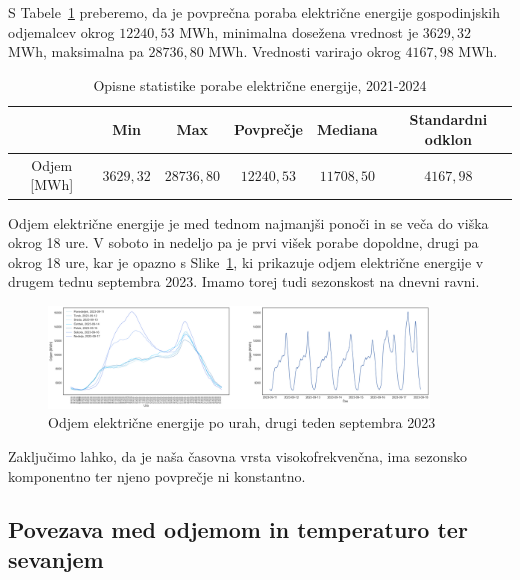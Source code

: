 \documentclass[a4paper, 11pt]{article}
\begin{document}
\noindent S Tabele~\ref{Tab:opisne_statistike} preberemo, da je povprečna poraba električne energije gospodinjskih odjemalcev
okrog $12240{,}53 $ MWh, minimalna dosežena vrednost je $3629{,}32$ MWh, maksimalna pa $28736{,}80$ MWh. Vrednosti varirajo
okrog $4167{,}98$ MWh. \\

\begin{table}[!h]
    \centering
    \caption{Opisne statistike porabe električne energije, 2021-2024}\par\medskip
    \label{Tab:opisne_statistike}
    \begin{tabular}{c||c|c|c|c|c}
              & Min & Max & Povprečje & Mediana & Standardni odklon \\ \hline \hline
        Odjem [MWh] & $3629{,}32$ & $28736{,}80$ & $12240{,}53$ & $11708{,}50$ & $4167{,}98$ \\ 
    \end{tabular}
\end{table}

\noindent Odjem električne energije je med tednom najmanjši ponoči in se veča do viška okrog 18 ure. 
V soboto in nedeljo pa je prvi višek porabe dopoldne, drugi pa okrog 18 ure, kar je opazno s Slike~\ref{fig:odjem_teden}, ki prikazuje odjem 
električne energije v drugem tednu septembra 2023. Imamo torej tudi sezonskost na dnevni ravni.

\begin{figure}[h!]
    \centering
    \caption{Odjem električne energije po urah, drugi teden septembra 2023}\par\medskip
    \label{fig:odjem_teden}
    \includegraphics[width=0.9\textwidth]{odjem_teden.png}
\end{figure}

\noindent Zaključimo lahko, da je naša časovna vrsta visokofrekvenčna, ima sezonsko komponentno ter njeno povprečje ni konstantno.


\subsection{Povezava med odjemom in temperaturo ter sevanjem}
\end{document}
